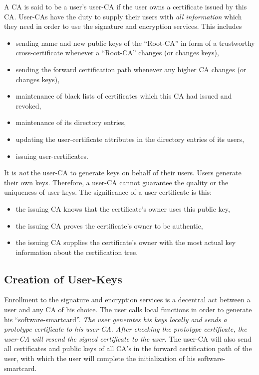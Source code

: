 A CA is said to be a user's user-CA if the user owns a certificate
issued by this CA.
User-CAs have the duty to supply their users with
{\em all information}
which they need in order
to use the signature and encryption services.
This includes

\begin{itemize}
\item
sending name and new public keys of the ``Root-CA''
in form of a trustworthy cross-certificate
whenever a ``Root-CA'' changes (or changes keys),
\item
sending the forward certification path whenever any higher
CA changes (or changes keys),
\item
maintenance of black lists of certificates
which this CA had issued and revoked,
\item
maintenance of its directory entries,
\item
updating the user-certificate attributes in the directory entries of its
users,
\item
issuing user-certificates.
\end{itemize}

It is {\em not} the user-CA to generate keys on behalf of their users.
Users generate their own keys.
Therefore, a user-CA cannot guarantee the quality or the uniqueness
of user-keys. The significance of a user-certificate is this:

\begin{itemize}
\item
the issuing CA knows that the certificate's owner uses this public key,
\item
the issuing CA proves the certificate's owner to be authentic,
\item
the issuing CA supplies the certificate's owner with the
most actual key information about the certification tree.
\end{itemize}

\subsection{Creation of User-Keys}
\label{ca-cuk}

Enrollment to the
signature and encryption services is a decentral act between a user
and any CA of his choice.
The user calls local functions in order to generate his
``software-smartcard''.
{\em The user generates his keys locally and sends a prototype
certificate to his user-CA. After checking the prototype
certificate, the user-CA will resend the signed certificate to the user}.
The user-CA will also send all certificates and public keys
of all CA's in the forward certification path of the user,
with which the user will complete the initialization of his
software-smartcard.

